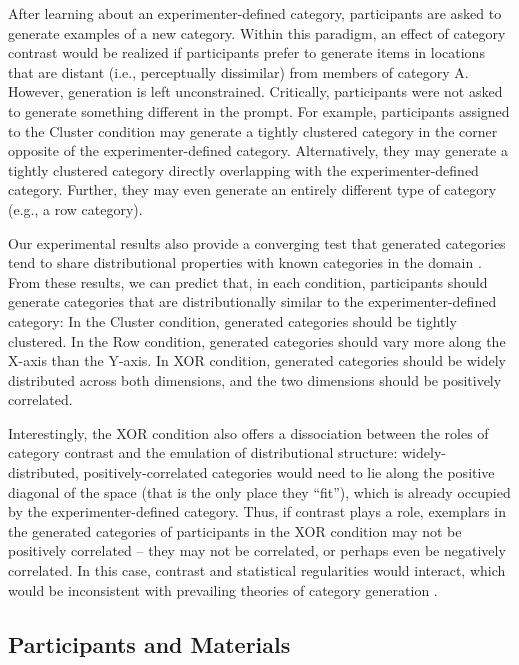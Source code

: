 \documentclass[pdflatex,sn-apa]{sn-jnl}%
\theoremstyle{thmstyleone}%
\theoremstyle{thmstyletwo}%
\theoremstyle{thmstylethree}%
\begin{document}
After learning about an experimenter-defined category, participants are asked to
generate examples of a new category. Within this paradigm, an effect of category
contrast would be realized if participants prefer to generate items in locations
that are distant (i.e., perceptually dissimilar) from members of category A.
However, generation is left unconstrained. Critically, participants were not
asked to generate something different in the prompt. For example, participants
assigned to the Cluster condition may generate a tightly clustered category in
the corner opposite of the experimenter-defined category. Alternatively, they
may generate a tightly clustered category directly overlapping with the
experimenter-defined category. Further, they may even generate an entirely
different type of category (e.g., a row category).

Our experimental results also provide a converging test
that generated categories tend to share distributional properties with known
categories in the domain \citep{jern2013probabilistic,ward1994structured}. From
these results, we can predict that, in each condition, participants should
generate categories that are distributionally similar to the
experimenter-defined category: In the Cluster condition, generated categories
should be tightly clustered. In the Row condition, generated categories should
vary more along the X-axis than the Y-axis. In XOR condition, generated
categories should be widely distributed across both dimensions, and the two
dimensions should be positively correlated.

Interestingly, the XOR condition also offers a dissociation between the roles of
category contrast and the emulation of distributional structure:
widely-distributed, positively-correlated categories would need to lie along the
positive diagonal of the space (that is the only place they ``fit''), which is
already occupied by the experimenter-defined category. Thus, if contrast plays a
role, exemplars in the generated categories of participants in the XOR condition
may not be positively correlated -- they may not be correlated, or perhaps even
be negatively correlated. In this case, contrast and statistical regularities
would interact, which would be inconsistent with prevailing theories of category
generation \citep{jern2013probabilistic}.


\subsection{Participants and Materials}
\end{document}
